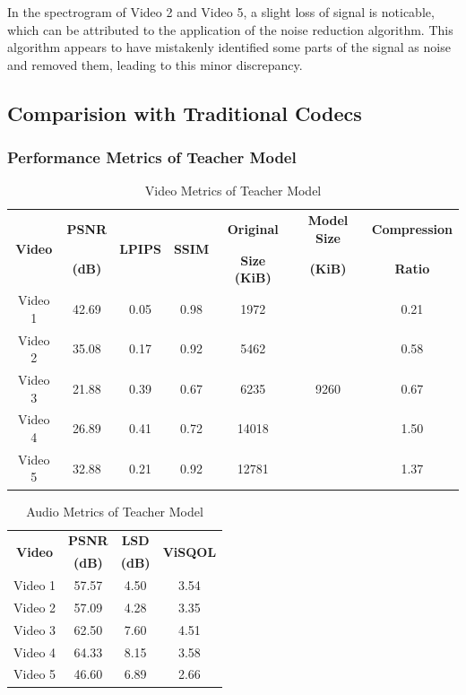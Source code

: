 \documentclass{ioereport}
\begin{document}
In the spectrogram of Video 2 and Video 5, a slight loss of signal is noticable, which can be attributed to the application of the noise reduction algorithm. This algorithm appears to have mistakenly identified some parts of the signal as noise and removed them, leading to this minor discrepancy.


\subsection{Comparision with Traditional Codecs}
    \subsubsection{Performance Metrics of Teacher Model}
    \begin{table}[H]
        \centering
        \caption{Video Metrics of Teacher Model}
        \label{table:video-metric-teacher}
        \begin{tabular}{|c|c|c|c|c|c|c|}
        \hline
        \multirow{2}{*}{\textbf{Video}} & \textbf{PSNR} & \multirow{2}{*}{\textbf{LPIPS}} & \multirow{2}{*}{\textbf{SSIM}} & \textbf{Original} & \textbf{Model Size} & \textbf{Compression} \\
        & \textbf{(dB)} &  &  & \textbf{Size (KiB)} & \textbf{(KiB)} & \textbf{Ratio} \\
        \hline
        Video 1 & 42.69 & 0.05 & 0.98 & 1972 & \multirow{5}{*}{9260} & 0.21 \\
        \cline{1-5} \cline{7-7}
        Video 2 & 35.08 & 0.17 & 0.92 & 5462 &  & 0.58 \\
        \cline{1-5} \cline{7-6}
        Video 3 & 21.88 & 0.39 & 0.67 & 6235 &  & 0.67 \\
        \cline{1-5} \cline{7-7}
        Video 4 & 26.89 & 0.41 & 0.72 & 14018 &  & 1.50 \\
        \cline{1-5} \cline{7-7}
        Video 5 & 32.88 & 0.21 & 0.92 & 12781 &  & 1.37 \\
        \hline
        \end{tabular}
    \end{table}
    
    \begin{table}[H]
        \centering
        \caption{Audio Metrics of Teacher Model}
        \label{table:audio-metric-teacher}
        \begin{tabular}{|c|c|c|c|}
        \hline
        \multirow{2}{*}{\textbf{Video}} & \textbf{PSNR} & \textbf{LSD} & \multirow{2}{*}{\textbf{ViSQOL}}\\
        & \textbf{(dB)} & \textbf{(dB)} &  \\
        \hline
        Video 1 & 57.57 & 4.50 & 3.54 \\
        \hline
        Video 2 & 57.09 & 4.28 & 3.35 \\
        \hline
        Video 3 & 62.50 & 7.60 & 4.51 \\
        \hline
        Video 4 & 64.33 & 8.15 & 3.58 \\
        \hline
        Video 5 & 46.60 & 6.89 & 2.66 \\
        \hline
        \end{tabular}
    \end{table}
\end{document}
